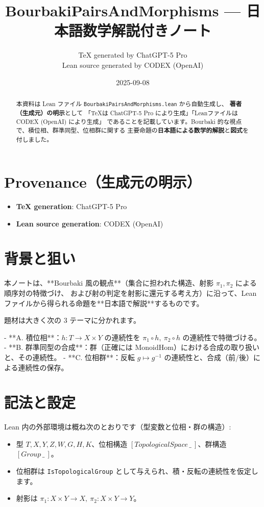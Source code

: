 \documentclass[11pt]{article}
\title{BourbakiPairsAndMorphisms — 日本語数学解説付きノート}
\author{TeX generated by ChatGPT-5 Pro\\Lean source generated by CODEX (OpenAI)}
\date{2025-09-08}
\theoremstyle{definition}
\begin{document}
\maketitle

\begin{abstract}
本資料は Lean ファイル \texttt{BourbakiPairsAndMorphisms.lean} から自動生成し、
\textbf{著者（生成元）の明示}として
「TeXは ChatGPT-5 Pro により生成」「Leanファイルは CODEX (OpenAI) により生成」
であることを記載しています。Bourbaki 的な視点で、積位相、群準同型、位相群に関する
主要命題の\textbf{日本語による数学的解説}と\textbf{図式}を付しました。
\end{abstract}

\section*{Provenance（生成元の明示）}
\begin{itemize}
  \item \textbf{TeX generation}: ChatGPT-5 Pro
  \item \textbf{Lean source generation}: CODEX (OpenAI)
\end{itemize}

\section*{背景と狙い}
本ノートは、**Bourbaki 風の観点**（集合に担われた構造、射影 $\pi_1,\pi_2$ による順序対の特徴づけ、
および射の判定を射影に還元する考え方）に沿って、Lean ファイルから得られる命題を**日本語で解説**するものです。

題材は大きく次の 3 テーマに分かれます。

- **A. 積位相**：$h:T\to X\times Y$ の連続性を $\pi_1\circ h,\ \pi_2\circ h$ の連続性で特徴づける。
- **B. 群準同型の合成**：群（正確には MonoidHom）における合成の取り扱いと、その連続性。
- **C. 位相群**：反転 $g\mapsto g^{-1}$ の連続性と、合成（前/後）による連続性の保存。

\section*{記法と設定}
Lean 内の外部環境は概ね次のとおりです（型変数と位相・群の構造）:
\begin{itemize}
  \item 型 $T,X,Y,Z,W,G,H,K$、位相構造 $[{TopologicalSpace}\,\_\ ]$、群構造 $[{Group}\,\_\ ]$。
  \item 位相群は \verb|IsTopologicalGroup| として与えられ、積・反転の連続性を仮定します。
  \item 射影は $\pi_1:X\times Y\to X,\ \pi_2:X\times Y\to Y$。
\end{itemize}
\end{document}
